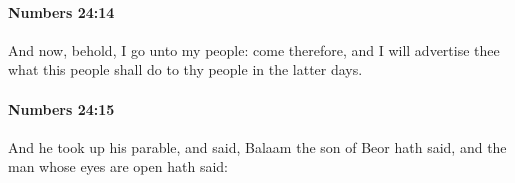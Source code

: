		\paragraph{Numbers 24:14} %
			\label{NUMBERS-24-14}

			And now, behold, I go unto my people: come therefore, and I will advertise thee what this people shall do to thy people in the latter days.


		\paragraph{Numbers 24:15} %
			\label{NUMBERS-24-15}

			And he took up his parable, and said, Balaam the son of Beor hath said, and the man whose eyes are open hath said:


